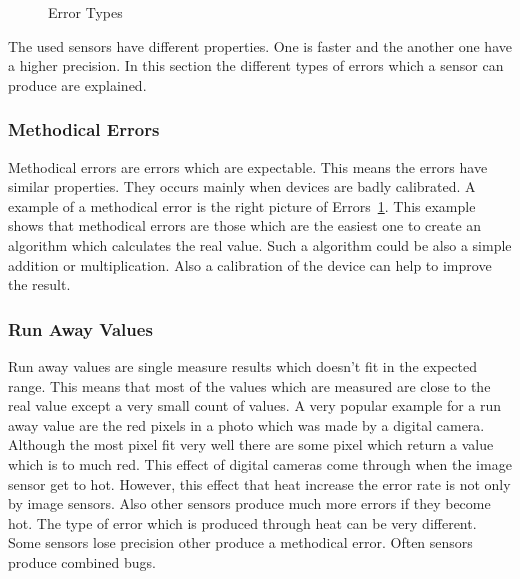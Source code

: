 \begin{figure}
{
}
\caption{Error Types}%
\label{fig:errorTypes}
\end{figure}
The used sensors have different properties.
One is faster and the another one have a higher precision.
In this section the different types of errors which a sensor can produce are explained.


\subsubsection{Methodical Errors}
Methodical errors are errors which are expectable.
This means the errors have similar properties.
They occurs mainly when devices are badly calibrated.
A example of a methodical error is the right picture of Errors~\ref{fig:errorTypes}.
This example shows that methodical errors are those which are the easiest one to create an algorithm which calculates the real value.
Such a algorithm could be also a simple addition or multiplication.
Also a calibration of the device can help to improve the result.


\subsubsection{Run Away Values}
Run away values are single measure results which doesn't fit in the expected range.
This means that most of the values which are measured are close to the real value except a very small count of values.
A very popular example for a run away value are the red pixels in a photo which was made by a digital camera.
Although the most pixel fit very well there are some pixel which return a value which is to much red.
This effect of digital cameras come through when the image sensor get to hot.
However, this effect that heat increase the error rate is not only by image sensors.
Also other sensors produce much more errors if they become hot.
The type of error which is produced through heat can be very different.
Some sensors lose precision other produce a methodical error.
Often sensors produce combined bugs.


